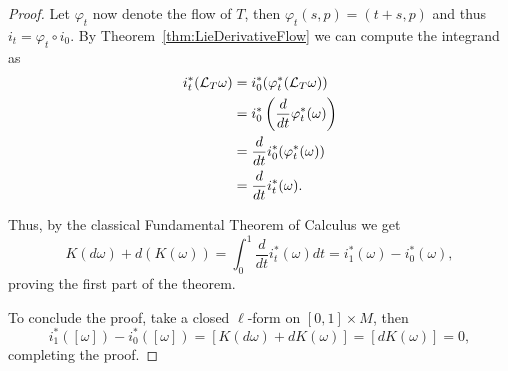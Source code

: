 \begin{proof}
	Let $\varphi_t$ now denote the flow of $T$, then $\varphi_t(s, p) = (t+s, p)$ and thus $i_t = \varphi_t \circ i_0$.
	By Theorem~\ref{thm:LieDerivativeFlow} we can compute the integrand as
	\begin{align}
		i_t^*(\mathcal{L}_T\omega) & = i^*_0(\varphi_t^*(\mathcal{L}_T\omega))                    \\
		                   & = i_0^*\left(\frac{d}{dt} \varphi_t^*(\omega)\right) \\
		                   & = \frac{d}{dt} i_0^*(\varphi_t^*(\omega))            \\
		                   & = \frac{d}{dt} i_t^*(\omega).
	\end{align}

	Thus, by the classical Fundamental Theorem of Calculus we get
	\begin{equation}
		K(d\omega) + d(K(\omega)) = \int_0^1 \frac{d}{dt} i_t^*(\omega) dt = i_1^*(\omega) - i_0^*(\omega),
	\end{equation}
	proving the first part of the theorem.

	To conclude the proof, take a closed $\ell$-form on $[0,1]\times M$, then
	\begin{equation}
		i_1^*([\omega]) - i_0^*([\omega]) = [K(d\omega) + dK(\omega)] = [dK(\omega)] =0,
	\end{equation}
	completing the proof.
\end{proof}

